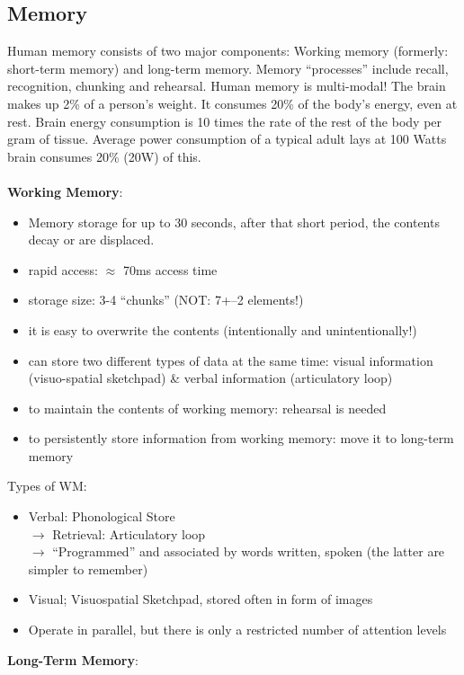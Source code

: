 \subsection{Memory}
Human memory consists of two major components: Working memory (formerly: short-term memory) and long-term memory. Memory ``processes'' include recall, recognition, chunking and rehearsal. Human memory is multi-modal! The brain makes up 2\% of a person's weight. It consumes 20\% of the body's energy, even at rest. Brain energy consumption is 10 times the rate of the rest of the body per gram of tissue. Average power consumption of a typical adult lays at 
100 Watts brain consumes 20\% (20W) of this.\\ \\
\textbf{Working Memory}:
\begin{itemize}
\item Memory storage for up to 30 seconds, after that short period, the contents decay or are displaced.
\item rapid access: $\approx$ 70ms access time
\item storage size: 3-4 ``chunks'' (NOT: 7+--2 elements!)
\item it is easy to overwrite the contents (intentionally and
unintentionally!)
\item can store two different types of data at the same time: visual information (visuo-spatial sketchpad) \& verbal information (articulatory loop)
\item to maintain the contents of working memory: rehearsal is needed
\item to persistently store information from working memory: move it to long-term memory
\end{itemize}
Types of WM:
\begin{itemize}
\item Verbal: Phonological Store\\
$\rightarrow$ Retrieval: Articulatory loop\\
$\rightarrow$ ``Programmed'' and associated by words written, spoken (the latter are simpler to remember)
\item Visual; Visuospatial Sketchpad, stored often in form of images
\item Operate in parallel, but there is only a restricted number of attention levels
\end{itemize}
\textbf{Long-Term Memory}:
